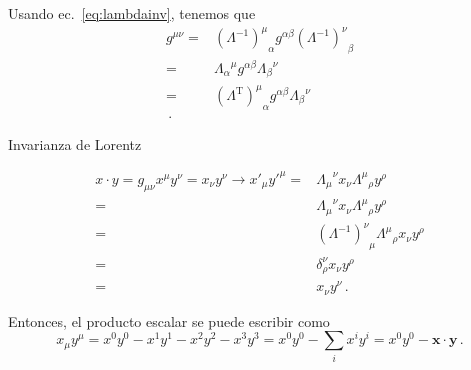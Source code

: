 \begin{frame}
Usando ec.~\eqref{eq:lambdainv}, tenemos que
\begin{align}
  \label{eq:Lambdacontra}
  g^{\mu\nu}=&{\left( \Lambda^{-1} \right)^{\mu}}_{\alpha}g^{\alpha\beta} {\left( \Lambda^{-1} \right)^{\nu}}_{\beta}\nonumber\\
=&{\Lambda_{\alpha}}^{\mu}g^{\alpha\beta}{\Lambda_{\beta}}^{\nu} \nonumber\\
=&{\left( \Lambda^{\operatorname{T}} \right)^{\mu}}_{\alpha}g^{\alpha\beta}{\Lambda_{\beta}}^{\nu} \nonumber\\\,.           
\end{align}


\end{frame}



\begin{frame}
\begin{example}
  


Invarianza de Lorentz

  \begin{align}
  x\cdot y= g_{\mu\nu}x^{\mu}y^{\nu}=  x_\nu y^\nu\to x'_\mu{y'}^\mu=&{\Lambda_\mu}^\nu x_\nu{\Lambda^\mu}_\rho y^\rho \nonumber\\
    =&{\Lambda_\mu}^\nu x_\nu{\Lambda^\mu}_\rho y^\rho \nonumber\\
    =&{\left(\Lambda^{-1}\right)^\nu}_\mu{\Lambda^\mu}_\rho x_\nu y^\rho \nonumber\\
    =&\delta^\nu_\rho x_\nu y^\rho \nonumber\\
    =&x_\nu y^\nu \nonumber\,.
  \end{align}

  Entonces, el producto escalar se puede escribir como
\begin{equation}
  x_\mu y^\mu=x^0y^0-x^1y^1-x^2y^2-x^3y^3=x^0y^0-\sum_{i}x^i y^i=x^0y^0-\boldsymbol{x}\cdot \boldsymbol{y}\,.
\end{equation}

\end{example}


\end{frame}

